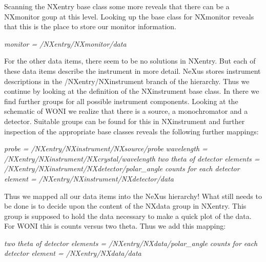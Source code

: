\documentclass[a4paper]{article}\usepackage[dvips]{graphicx}
\begin{document}
Scanning the NXentry base class some more reveals that there can be a NXmonitor goup at this level. Looking up the base 
class for NXmonitor reveals that this is the place to store our monitor information.


\begin{center}
 
 {\em  monitor = /NXentry/NXmonitor/data}


\end{center}


For the other data items, there seem to be no solutions in NXentry. But each of these data items describe the instrument in more 
detail. NeXus stores instrument descriptions in the /NXentry/NXinstrument branch of the hierarchy. Thus we continue by looking at 
the definition of the NXinstrument base class. In there we find further groups for all possible instrument components. Looking at the 
schematic of WONI we realize that there is a source, a monochromator and a detector. Suitable groups can be found for this in 
NXinstrument and further inspection of the appropriate base classes reveals the following further mappings:


\begin{center}

 {\em  probe = /NXentry/NXinstrument/NXsource/probe} \linebreak
 {\em  wavelength = /NXentry/NXinstrument/NXcrystal/wavelength} \linebreak
 {\em  two theta of detector elements = /NXentry/NXinstrument/NXdetector/polar\_angle}\linebreak
 {\em  counts for each detector element = /NXentry/NXinstrument/NXdetector/data}


\end{center}


Thus we mapped all our data items into the NeXus hierarchy! What still needs to be done is to decide upon the content of the NXdata 
group in NXentry. This group is supposed to hold the data necessary to make a quick plot of the data. For WONI this is counts versus 
two theta. Thus we add this mapping:


\begin{center}

 {\em  two theta of detector elements = /NXentry/NXdata/polar\_angle}\linebreak
 {\em  counts for each detector element = /NXentry/NXdata/data}\linebreak


\end{center}
\end{document}

